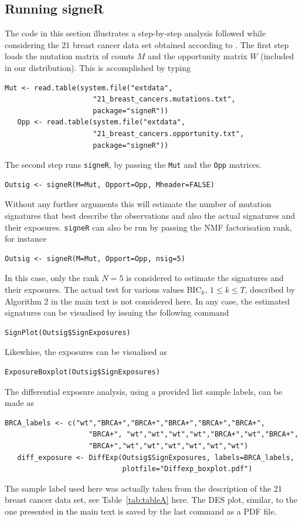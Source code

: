 \documentclass[11pt]{amsart}
\theoremstyle{definition}
\begin{document}
\subsection{Running signeR} The code in this section illustrates a
step-by-step analysis followed while considering the  21 breast cancer
data set obtained according to \cite{NCellFull}. The first step
loads the mutation matrix of counts $M$ and the opportunity matrix
$W$ (included in our distribution). This is accomplished by typing
\begin{lstlisting}[]
   Mut <- read.table(system.file("extdata",  
                     "21_breast_cancers.mutations.txt",
                     package="signeR"))
   Opp <- read.table(system.file("extdata",  
                     "21_breast_cancers.opportunity.txt",
                     package="signeR"))
\end{lstlisting}
The second step runs \texttt{signeR}, by passing the \texttt{Mut} and
the \texttt{Opp} matrices. 
\begin{lstlisting}[]
   Outsig <- signeR(M=Mut, Opport=Opp, Mheader=FALSE)
\end{lstlisting}
Without any further arguments this will estimate the number of
mutation signatures that best describe the observations and also the
actual signatures and their exposures. \texttt{signeR} can also be run
by passing the NMF factorisation rank, for
instance
\begin{lstlisting}[]
   Outsig <- signeR(M=Mut, Opport=Opp, nsig=5)
\end{lstlisting}
In this case, only the rank $N=5$ is considered to estimate the
signatures and their exposures. The actual test for various values
BIC$_k$, $1\leq k \leq T$, described by Algorithm 2 in the main text
is not considered here.  In any case, the estimated signatures can be
visualised by issuing the following command
\begin{lstlisting}[]
   SignPlot(Outsig$SignExposures)
\end{lstlisting}
Likewhise, the exposures can be visualised as
\begin{lstlisting}[]
   ExposureBoxplot(Outsig$SignExposures)
\end{lstlisting}


The differential exposure analysis, using a provided list sample
labels, can be made as
\begin{lstlisting}[]
   BRCA_labels <- c("wt","BRCA+","BRCA+","BRCA+","BRCA+","BRCA+",
                    "BRCA+", "wt","wt","wt","wt","BRCA+","wt","BRCA+",
                    "BRCA+","wt","wt","wt","wt","wt","wt")
   diff_exposure <- DiffExp(Outsig$SignExposures, labels=BRCA_labels,
                            plotfile="Diffexp_boxplot.pdf")
\end{lstlisting}
The sample label used here was actually taken from the description of
the 21 breast cancer data set, see Table~\ref{tab:tableA} here. The
DES plot, similar, to the one presented in the main text is saved by
the last command as a PDF file.
\end{document}
